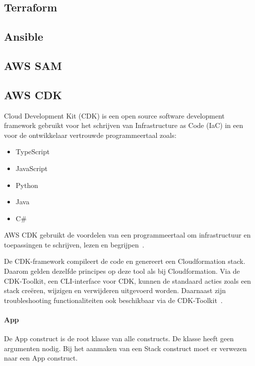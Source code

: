 \subsection{Terraform}
\label{subsec:service-terraform}

\subsection{Ansible}
\label{subsec:service-ansible}

\subsection{AWS SAM}
\label{subsec:service-sam}

\subsection{AWS CDK}
\label{subsec:service-cdk}

Cloud Development Kit (CDK) is een open source software development framework gebruikt voor het schrijven van Infrastructure as Code (IaC) in een voor de ontwikkelaar vertrouwde programmeertaal zoals:

\begin{itemize}
    \item TypeScript
    \item JavaScript
    \item Python
    \item Java
    \item C\#
\end{itemize}

AWS CDK gebruikt de voordelen van een programmeertaal om infrastructuur en toepassingen te schrijven, lezen en begrijpen~\autocite{Mansoor2014}.

De CDK-framework compileert de code en genereert een Cloudformation stack.
Daarom gelden dezelfde principes op deze tool als bij Cloudformation.
Via de CDK-Toolkit, een CLI-interface voor CDK, kunnen de standaard acties zoals een stack creëren, wijzigen en verwijderen uitgevoerd worden.
Daarnaast zijn troubleshooting functionaliteiten ook beschikbaar via de CDK-Toolkit~\autocite{Mansoor2014}.

\paragraph{App}

De App construct is de root klasse van alle constructs.
De klasse heeft geen argumenten nodig.
Bij het aanmaken van een Stack construct moet er verwezen naar een App construct.

